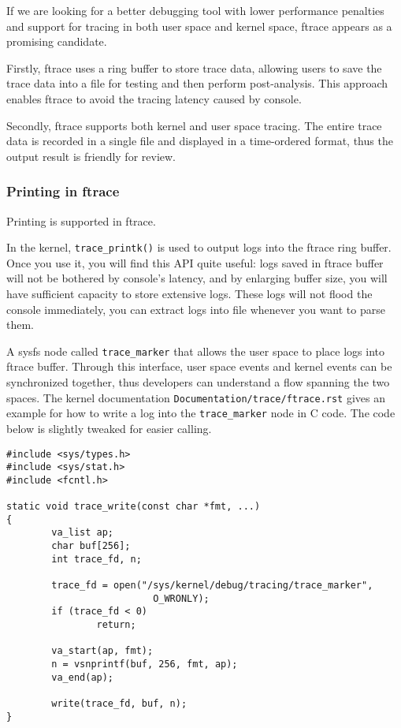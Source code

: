 \documentclass[11pt]{diazessay} %
\def\code#1{\texttt{#1}}
\begin{document}
If we are looking for a better debugging tool with lower performance penalties
and support for tracing in both user space and kernel space, ftrace appears as
a promising candidate.

Firstly, ftrace uses a ring buffer to store trace data, allowing users to save
the trace data into a file for testing and then perform post-analysis. This
approach enables ftrace to avoid the tracing latency caused by console.

Secondly, ftrace supports both kernel and user space tracing. The entire trace
data is recorded in a single file and displayed in a time-ordered format, thus
the output result is friendly for review.

\subsubsection*{Printing in ftrace}

Printing is supported in ftrace.

In the kernel, \code{trace\_printk()} is used to output logs into the ftrace
ring buffer. Once you use it, you will find this API quite useful: logs saved
in ftrace buffer will not be bothered by console's latency, and by
enlarging buffer size, you will have sufficient capacity to store extensive
logs. These logs will not flood the console immediately, you can extract logs
into file whenever you want to parse them.

A sysfs node called \code{trace\_marker} that allows the user space to place
logs into ftrace buffer. Through this interface, user space events and kernel
events can be synchronized together, thus developers can understand a flow
spanning the two spaces. The kernel documentation
\code{Documentation/trace/ftrace.rst} gives an example for how to write a log
into the \code{trace\_marker} node in C code. The code below is slightly
tweaked for easier calling.

\begin{lstlisting}
#include <sys/types.h>
#include <sys/stat.h>
#include <fcntl.h>

static void trace_write(const char *fmt, ...)
{
        va_list ap;
        char buf[256];
        int trace_fd, n;

        trace_fd = open("/sys/kernel/debug/tracing/trace_marker",
                          O_WRONLY);
        if (trace_fd < 0)
                return;

        va_start(ap, fmt);
        n = vsnprintf(buf, 256, fmt, ap);
        va_end(ap);

        write(trace_fd, buf, n);
}
\end{lstlisting}
\end{document}
